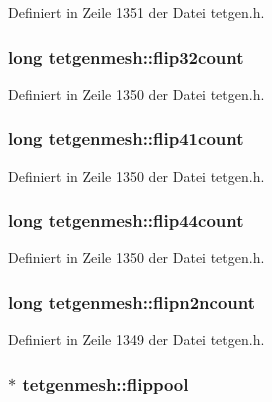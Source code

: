 Definiert in Zeile 1351 der Datei tetgen.\-h.

\hypertarget{classtetgenmesh_acbddc46c3d6f1a3c9cc160cd39ba674f}{
\subsubsection[{flip32count}]{\setlength{\rightskip}{0pt plus 5cm}long tetgenmesh\-::flip32count}}\label{classtetgenmesh_acbddc46c3d6f1a3c9cc160cd39ba674f}


Definiert in Zeile 1350 der Datei tetgen.\-h.

\hypertarget{classtetgenmesh_accf2261a6d043618bfbb7af3368eae51}{
\subsubsection[{flip41count}]{\setlength{\rightskip}{0pt plus 5cm}long tetgenmesh\-::flip41count}}\label{classtetgenmesh_accf2261a6d043618bfbb7af3368eae51}


Definiert in Zeile 1350 der Datei tetgen.\-h.

\hypertarget{classtetgenmesh_a84660f45542f2f8c6609fceb8ad00615}{
\subsubsection[{flip44count}]{\setlength{\rightskip}{0pt plus 5cm}long tetgenmesh\-::flip44count}}\label{classtetgenmesh_a84660f45542f2f8c6609fceb8ad00615}


Definiert in Zeile 1350 der Datei tetgen.\-h.

\hypertarget{classtetgenmesh_a7936b404bc33e830d0a7f80737f3fdf8}{
\subsubsection[{flipn2ncount}]{\setlength{\rightskip}{0pt plus 5cm}long tetgenmesh\-::flipn2ncount}}\label{classtetgenmesh_a7936b404bc33e830d0a7f80737f3fdf8}


Definiert in Zeile 1349 der Datei tetgen.\-h.

\hypertarget{classtetgenmesh_a96eb63bf97a4e4b9f9ad7148444bd530}{
\subsubsection[{flippool}]{$\ast$ tetgenmesh\-::flippool}}\label{classtetgenmesh_a96eb63bf97a4e4b9f9ad7148444bd530}


